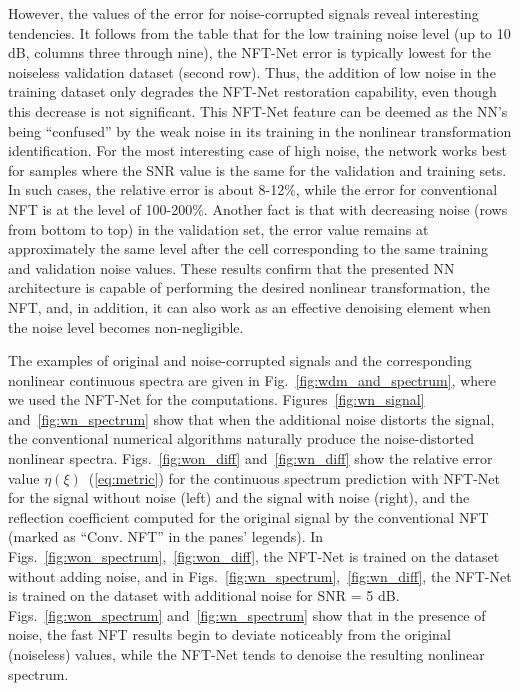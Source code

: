 However, the values of the error for noise-corrupted signals reveal interesting tendencies. 
It follows from the table that for the low training noise level (up to 10 dB, columns three through nine), the NFT-Net error is typically lowest for the noiseless validation dataset (second row).
Thus, the addition of low noise in the training dataset only degrades the NFT-Net restoration capability, even though this decrease is not significant. This NFT-Net feature can be deemed as the NN's being ``confused'' by the weak noise in its training in the nonlinear transformation identification. 
For the most interesting case of high noise, the network works best for samples where the SNR value is the same for the validation and training sets. 
In such cases, the relative error is about 8-12\%, while the error for conventional NFT is at the level of 100-200\%.
Another fact is that with decreasing noise (rows from bottom to top) in the validation set, the error value remains at approximately the same level after the cell corresponding to the same training and validation noise values. 
These results confirm that the presented NN architecture is capable of performing the desired nonlinear transformation, the NFT, and, in addition, it can also work as an effective denoising element when the noise level becomes non-negligible. 



The examples of original and noise-corrupted signals and the corresponding nonlinear continuous spectra are given in Fig.~\ref{fig:wdm_and_spectrum}, where we used the NFT-Net for the computations. Figures~\ref{fig:wn_signal} and~\ref{fig:wn_spectrum} show that when the additional noise distorts the signal, the conventional numerical algorithms naturally produce the noise-distorted nonlinear spectra.
Figs.~\ref{fig:won_diff} and~\ref{fig:wn_diff} show the relative error value $\eta(\xi)$~(\ref{eq:metric}) for the continuous spectrum prediction with NFT-Net for the signal without noise (left) and the signal with noise (right), and the reflection coefficient computed for the original signal by the conventional NFT (marked as ``Conv. NFT'' in the panes' legends). In Figs.~\ref{fig:won_spectrum},~\ref{fig:won_diff}, the NFT-Net is trained on the dataset without adding noise, and in Figs.~\ref{fig:wn_spectrum},~\ref{fig:wn_diff}, the NFT-Net is trained on the dataset with additional noise for SNR = 5 dB. Figs.~\ref{fig:won_spectrum} and~\ref{fig:wn_spectrum} show that in the presence of noise, the fast NFT results begin to deviate noticeably from the original (noiseless) values, while the NFT-Net tends to denoise the resulting nonlinear spectrum.








